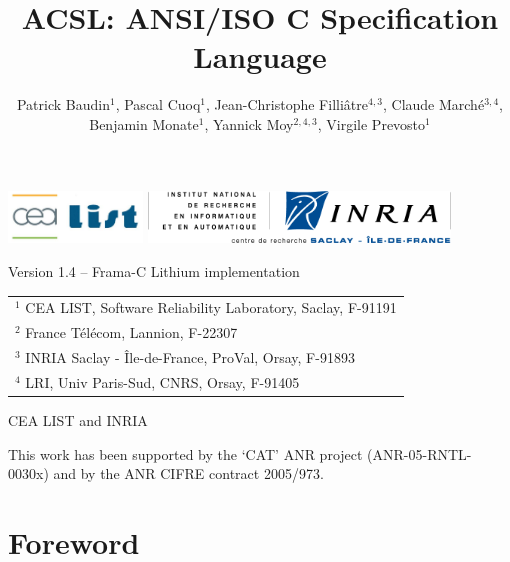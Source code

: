 \documentclass[a4paper,11pt,twoside,openright,web]{frama-c-book}
\newcommand{\version}{1.4}
\begin{document}
\sloppy
{}

%
  {}%
  {}

\begin{titlepage}
\includegraphics[height=14mm]{cealistlogo.jpg}
\hfill
\includegraphics[height=14mm]{inriasaclaylogo.png}
\vfill
\title{ACSL: ANSI/ISO C Specification Language}%
{Version \version{} -- Frama-C Lithium implementation}
\author{Patrick Baudin$^1$, Pascal Cuoq$^1$, Jean-Christophe Filli\^atre$^{4,3}$, Claude March\'e$^{3,4}$,\\ Benjamin Monate$^1$, Yannick Moy$^{2,4,3}$, Virgile Prevosto$^1$}

\begin{tabular}{l}
$^1$ CEA LIST, Software Reliability Laboratory, Saclay, F-91191 \\
$^2$ France T\'el\'ecom, Lannion, F-22307 \\
$^3$ INRIA Saclay - \^Ile-de-France, ProVal, Orsay, F-91893 \\
$^4$ LRI, Univ Paris-Sud, CNRS, Orsay, F-91405
\end{tabular}
\vfill
\begin{flushleft}
   CEA LIST and INRIA

  This work has been supported by the `CAT' ANR project
  (ANR-05-RNTL-0030x) and by the ANR CIFRE contract 2005/973.
\end{flushleft}
\end{titlepage}

\cleardoublepage
\label{chap:contents}
\tableofcontents

\chapter*{Foreword}

\end{document}

